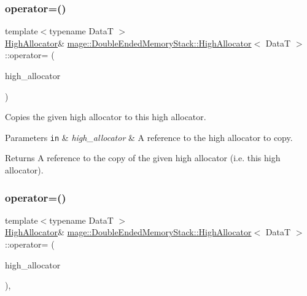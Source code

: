 \subsubsection{\texorpdfstring{operator=()}{operator=()}\hspace{0.1cm}{\footnotesize\ttfamily [1/2]}}
{\footnotesize\ttfamily template$<$typename DataT $>$ \\
\hyperlink{classmage_1_1_double_ended_memory_stack_1_1_high_allocator}{High\+Allocator}\& \hyperlink{classmage_1_1_double_ended_memory_stack_1_1_high_allocator}{mage\+::\+Double\+Ended\+Memory\+Stack\+::\+High\+Allocator}$<$ DataT $>$\+::operator= (\begin{DoxyParamCaption}\item[{const \hyperlink{classmage_1_1_double_ended_memory_stack_1_1_high_allocator}{High\+Allocator}$<$ DataT $>$ \&}]{high\+\_\+allocator }\end{DoxyParamCaption})\hspace{0.3cm}{\ttfamily [delete]}}

Copies the given high allocator to this high allocator.


\begin{DoxyParams}[1]{Parameters}
\mbox{\tt in}  & {\em high\+\_\+allocator} & A reference to the high allocator to copy. \\
\hline
\end{DoxyParams}
\begin{DoxyReturn}{Returns}
A reference to the copy of the given high allocator (i.\+e. this high allocator). 
\end{DoxyReturn}
\hypertarget{classmage_1_1_double_ended_memory_stack_1_1_high_allocator_aa596d086d499f6c9369edecc4aa22882}{}\label{classmage_1_1_double_ended_memory_stack_1_1_high_allocator_aa596d086d499f6c9369edecc4aa22882} 
\subsubsection{\texorpdfstring{operator=()}{operator=()}\hspace{0.1cm}{\footnotesize\ttfamily [2/2]}}
{\footnotesize\ttfamily template$<$typename DataT $>$ \\
\hyperlink{classmage_1_1_double_ended_memory_stack_1_1_high_allocator}{High\+Allocator}\& \hyperlink{classmage_1_1_double_ended_memory_stack_1_1_high_allocator}{mage\+::\+Double\+Ended\+Memory\+Stack\+::\+High\+Allocator}$<$ DataT $>$\+::operator= (\begin{DoxyParamCaption}\item[{\hyperlink{classmage_1_1_double_ended_memory_stack_1_1_high_allocator}{High\+Allocator}$<$ DataT $>$ \&\&}]{high\+\_\+allocator }\end{DoxyParamCaption})\hspace{0.3cm}{\ttfamily [default]}, {\ttfamily [noexcept]}}

